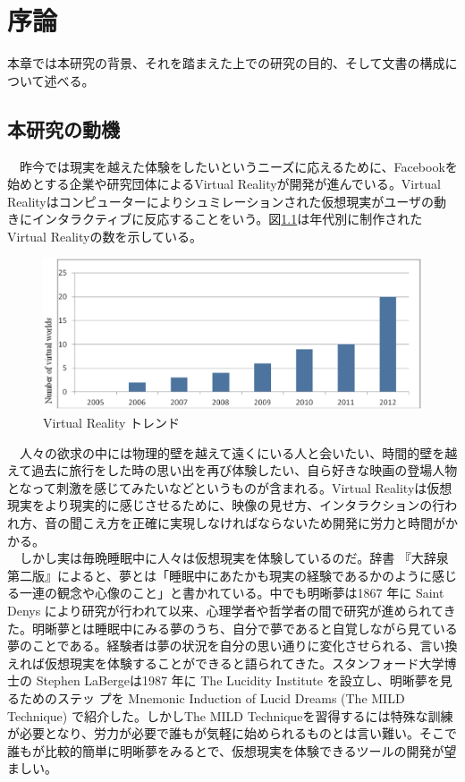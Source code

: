 \chapter{序論}
\label{chap:introduction}

本章では本研究の背景、それを踏まえた上での研究の目的、そして文書の構成について述べる。

\section{本研究の動機}
　昨今では現実を越えた体験をしたいというニーズに応えるために、Facebookを始めとする企業や研究団体によるVirtual Realityが開発が進んでいる\cite{vrtrendShiny}。Virtual Realityはコンピューターによりシュミレーションされた仮想現実がユーザの動きにインタラクティブに反応することをいう。図\ref{trends}は年代別に制作されたVirtual Realityの数を示している\cite{vrtrendSamuel}。\\

\begin{figure}[htbp]
\begin{center}
\includegraphics[width=15cm]{eps/vrTrends.eps}
\caption{Virtual Reality トレンド}
\label{trends}
\end{center}
\end{figure}

　人々の欲求の中には物理的壁を越えて遠くにいる人と会いたい、時間的壁を越えて過去に旅行をした時の思い出を再び体験したい、自ら好きな映画の登場人物となって刺激を感じてみたいなどというものが含まれる。Virtual Realityは仮想現実をより現実的に感じさせるために、映像の見せ方、インタラクションの行われ方、音の聞こえ方を正確に実現しなければならないため開発に労力と時間がかかる\cite{vrtrendShiny}。\\
　しかし実は毎晩睡眠中に人々は仮想現実を体験しているのだ。辞書 『大辞泉 第二版』によると、夢とは「睡眠中にあたかも現実の経験であるかのように感じる一連の観念や心像のこと」\cite{dream}と書かれている。中でも明晰夢は1867 年に Saint Denys により研究が行われて以来\cite{saintDenys}、心理学者や哲学者の間で研究が進められてきた。明晰夢とは睡眠中にみる夢のうち、自分で夢であると自覚しながら見ている夢のことである。経験者は夢の状況を自分の思い通りに変化させられる、言い換えれば仮想現実を体験することができると語られてきた。スタンフォード大学博士の Stephen LaBergeは1987 年に The Lucidity Institute を設立し、明晰夢を見るためのステッ プを Mnemonic Induction of Lucid Dreams (The MILD Technique) で紹介した\cite{LaBerge}。しかしThe MILD Techniqueを習得するには特殊な訓練が必要となり、労力が必要で誰もが気軽に始められるものとは言い難い。そこで誰もが比較的簡単に明晰夢をみるとで、仮想現実を体験できるツールの開発が望ましい。

